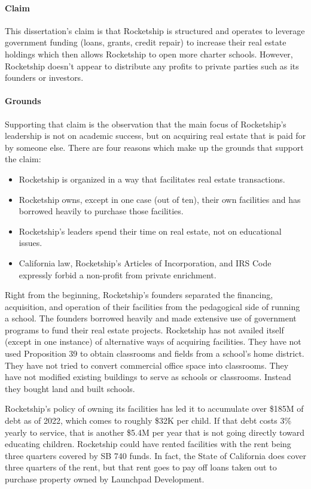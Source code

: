 \paragraph{Claim}\label{p:claim}
This dissertation's claim is that Rocketship is structured and operates to leverage government funding (loans, grants, credit repair) to increase their real estate holdings which then allows Rocketship to open more charter schools. However, Rocketship doesn't appear to distribute any profits to private parties such as its founders or investors.

\paragraph{Grounds}
Supporting that claim is the observation that the main focus of Rocketship's leadership is not on academic success, but on acquiring real estate that is paid for by someone else. There are four reasons which make up the grounds that support the claim:
\begin{itemize}
  \item Rocketship is organized in a way that facilitates real estate transactions.
  \item Rocketship owns, except in one case (out of ten), their own facilities and has borrowed heavily to purchase those facilities.
  \item Rocketship's leaders spend their time on real estate, not on educational issues.
  \item California law, Rocketship's Articles of Incorporation, and IRS Code expressly forbid a non-profit from private enrichment.
\end{itemize}

Right from the beginning, Rocketship's founders separated the financing, acquisition, and operation of their facilities from the pedagogical side of running a school. The founders borrowed heavily and made extensive use of government programs to fund their real estate projects. Rocketship has not availed itself (except in one instance) of alternative ways of acquiring facilities. They have not used Proposition 39 to obtain classrooms and fields from a school's home district. They have not tried to convert commercial office space into classrooms. They have not modified existing buildings to serve as schools or classrooms. Instead they bought land and built schools.

Rocketship’s policy of owning its facilities has led it to accumulate over \$185M of debt as of 2022, which comes to roughly \$32K per child. If that debt costs 3\% yearly to service, that is another \$5.4M per year that is not going directly toward educating children. Rocketship could have rented facilities with the rent being three quarters covered by SB 740 funds. In fact, the State of California does cover three quarters of the rent, but that rent goes to pay off loans taken out to purchase property owned by Launchpad Development. 

